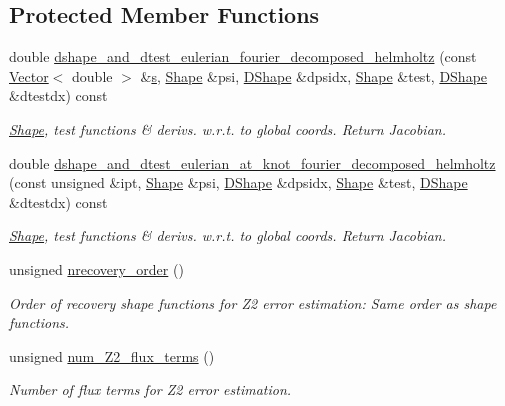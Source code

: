 \subsection*{Protected Member Functions}
\begin{DoxyCompactItemize}
\item 
double \hyperlink{classoomph_1_1TFourierDecomposedHelmholtzElement_ae54e119a74f455c251ede7d536a7c0ab}{dshape\+\_\+and\+\_\+dtest\+\_\+eulerian\+\_\+fourier\+\_\+decomposed\+\_\+helmholtz} (const \hyperlink{classoomph_1_1Vector}{Vector}$<$ double $>$ \&\hyperlink{cfortran_8h_ab7123126e4885ef647dd9c6e3807a21c}{s}, \hyperlink{classoomph_1_1Shape}{Shape} \&psi, \hyperlink{classoomph_1_1DShape}{D\+Shape} \&dpsidx, \hyperlink{classoomph_1_1Shape}{Shape} \&test, \hyperlink{classoomph_1_1DShape}{D\+Shape} \&dtestdx) const
\begin{DoxyCompactList}\small\item\em \hyperlink{classoomph_1_1Shape}{Shape}, test functions \& derivs. w.\+r.\+t. to global coords. Return Jacobian. \end{DoxyCompactList}\item 
double \hyperlink{classoomph_1_1TFourierDecomposedHelmholtzElement_a4bb917f49d4c15773f62583976b6d0de}{dshape\+\_\+and\+\_\+dtest\+\_\+eulerian\+\_\+at\+\_\+knot\+\_\+fourier\+\_\+decomposed\+\_\+helmholtz} (const unsigned \&ipt, \hyperlink{classoomph_1_1Shape}{Shape} \&psi, \hyperlink{classoomph_1_1DShape}{D\+Shape} \&dpsidx, \hyperlink{classoomph_1_1Shape}{Shape} \&test, \hyperlink{classoomph_1_1DShape}{D\+Shape} \&dtestdx) const
\begin{DoxyCompactList}\small\item\em \hyperlink{classoomph_1_1Shape}{Shape}, test functions \& derivs. w.\+r.\+t. to global coords. Return Jacobian. \end{DoxyCompactList}\item 
unsigned \hyperlink{classoomph_1_1TFourierDecomposedHelmholtzElement_a6689b57135220a2e5a5b8dc275b6510a}{nrecovery\+\_\+order} ()
\begin{DoxyCompactList}\small\item\em Order of recovery shape functions for Z2 error estimation\+: Same order as shape functions. \end{DoxyCompactList}\item 
unsigned \hyperlink{classoomph_1_1TFourierDecomposedHelmholtzElement_aba47a0cfee28a78ac416a49c91e6262a}{num\+\_\+\+Z2\+\_\+flux\+\_\+terms} ()
\begin{DoxyCompactList}\small\item\em Number of \textquotesingle{}flux\textquotesingle{} terms for Z2 error estimation. \end{DoxyCompactList}\item 

\end{DoxyCompactItemize}
